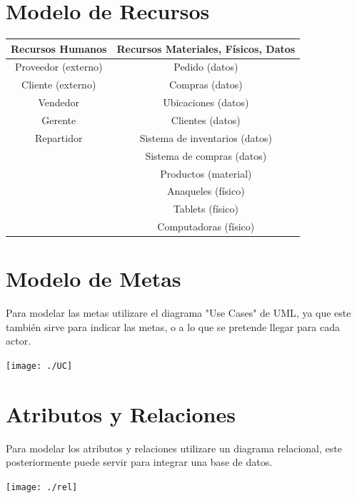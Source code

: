\documentclass[spanish,12pt,letterpapper]{article}
\begin{document}
	
	\section{Modelo de Recursos}
	\begin{tabular}{c c}
	\hline
	\textbf{Recursos Humanos} & \textbf{Recursos Materiales, Físicos, Datos}\\
	\hline
	Proveedor (externo) & Pedido (datos)\\
	Cliente (externo) & Compras (datos)\\
	Vendedor & Ubicaciones (datos)\\
	Gerente & Clientes (datos)\\
	Repartidor & Sistema de inventarios (datos)\\
	& Sistema de compras (datos)\\
	& Productos (material)\\
	& Anaqueles (físico)\\
	& Tablets (físico)\\
	& Computadoras (físico)\\
	\hline
	\end{tabular}
	
	\section{Modelo de Metas}
	Para modelar las metas utilizare el diagrama "Use Cases" de UML, ya que este también sirve para indicar las metas, o a lo que se pretende llegar para cada actor.
	\begin{center}
	\texttt{[image: ./UC]}~\\[1cm] 
	\end{center}
	
	\section{Atributos y Relaciones}
	Para modelar los atributos y relaciones utilizare un diagrama relacional, este posteriormente puede servir para integrar una base de datos.
	\begin{center}
	\texttt{[image: ./rel]}~\\[1cm] 
	\end{center}
	
\end{document}
